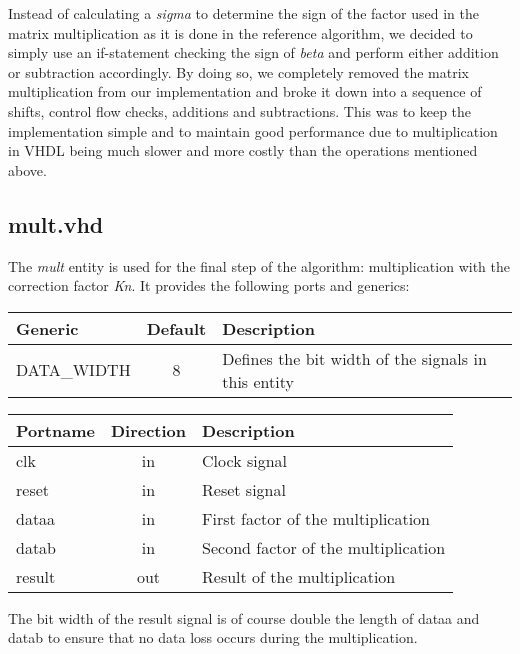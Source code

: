 Instead of calculating a \textit{sigma} to determine the sign of the factor used in the matrix multiplication as it is done in the reference algorithm, we decided to simply use an if-statement checking the sign of \textit{beta} and perform either addition or subtraction accordingly. By doing so, we completely removed the matrix multiplication from our implementation and broke it down into a sequence of shifts, control flow checks, additions and subtractions. This was to keep the implementation simple and to maintain good performance due to multiplication in VHDL being much slower and more costly than the operations mentioned above.

\subsection{mult.vhd} 

The \textit{mult} entity is used for the final step of the algorithm:  multiplication with the correction factor \textit{Kn}. It provides the following ports and generics:

\begin{center}
	\begin{tabular}{ | l | c | l | }
		\hline
		\textbf{Generic} & \textbf{Default} & \textbf{Description} \\
		\hline
		DATA\_WIDTH & 8 & Defines the bit width of the signals in this entity \\
		\hline
	\end{tabular} 
\end{center}

\begin{center}
	\begin{tabular}{ | l | c | l | }
		\hline
		\textbf{Portname} & \textbf{Direction} & \textbf{Description} \\
		\hline
		clk & in & Clock signal \\
		reset & in  & Reset signal \\
		dataa & in  & First factor of the multiplication \\
		datab & in  & Second factor of the multiplication \\
		result & out  & Result of the multiplication \\
		\hline
	\end{tabular} 
\end{center}

The bit width of the result signal is of course double the length of dataa and datab to ensure that no data loss occurs during the multiplication.

